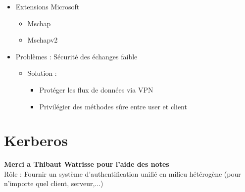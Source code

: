 \documentclass[a4paper]{article}
\begin{document}
\begin{itemize}[label = \textbullet, font = \Large]
\begin{itemize}[label=, font=\scriptsize]
\begin{itemize}
\begin{enumerate}
            \end{enumerate}
          \end{itemize}
        \end{itemize}
        \item Extensions Microsoft
        \begin{itemize}[label=, font=\scriptsize]
          \item Mschap
          \item Mschapv2
        \end{itemize}
        \item Problèmes : Sécurité des échanges faible
        \begin{itemize}[label=, font=\scriptsize]
          \item Solution :
          \begin{itemize}
            \item Protéger les flux de données via VPN
            \item Privilégier des méthodes sûre entre user et client
          \end{itemize}
        \end{itemize}
      \end{itemize}

      \section{Kerberos}
      \textbf{Merci a Thibaut Watrisse pour l'aide des notes}\\
      Rôle : Fournir un système d'authentification unifié en milieu hétérogène (pour n'importe quel client, serveur,...)
\end{document}
